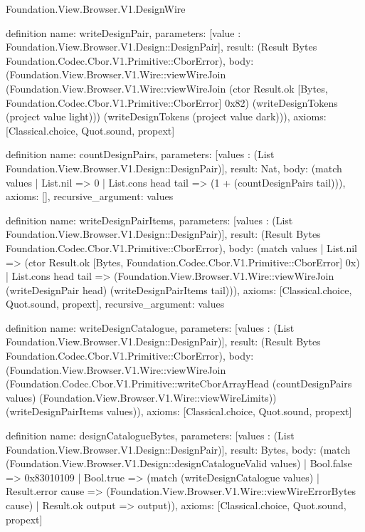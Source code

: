 \begin{lexlean}{Foundation.View.Browser.V1.DesignWire}
\begin{semanticmodule}
definition{
  name: writeDesignPair,
  parameters: [value : Foundation.View.Browser.V1.Design::DesignPair],
  result: (Result Bytes Foundation.Codec.Cbor.V1.Primitive::CborError),
  body: (Foundation.View.Browser.V1.Wire::viewWireJoin (Foundation.View.Browser.V1.Wire::viewWireJoin (ctor Result.ok [Bytes, Foundation.Codec.Cbor.V1.Primitive::CborError] 0x82) (writeDesignTokens (project value light))) (writeDesignTokens (project value dark))),
  axioms: [Classical.choice, Quot.sound, propext]
}

definition{
  name: countDesignPairs,
  parameters: [values : (List Foundation.View.Browser.V1.Design::DesignPair)],
  result: Nat,
  body: (match values | List.nil => 0 | List.cons head tail => (1 + (countDesignPairs tail))),
  axioms: [],
  recursive_argument: values
}

definition{
  name: writeDesignPairItems,
  parameters: [values : (List Foundation.View.Browser.V1.Design::DesignPair)],
  result: (Result Bytes Foundation.Codec.Cbor.V1.Primitive::CborError),
  body: (match values
    | List.nil => (ctor Result.ok [Bytes, Foundation.Codec.Cbor.V1.Primitive::CborError] 0x)
    | List.cons head tail => (Foundation.View.Browser.V1.Wire::viewWireJoin (writeDesignPair head) (writeDesignPairItems tail))),
  axioms: [Classical.choice, Quot.sound, propext],
  recursive_argument: values
}

definition{
  name: writeDesignCatalogue,
  parameters: [values : (List Foundation.View.Browser.V1.Design::DesignPair)],
  result: (Result Bytes Foundation.Codec.Cbor.V1.Primitive::CborError),
  body: (Foundation.View.Browser.V1.Wire::viewWireJoin (Foundation.Codec.Cbor.V1.Primitive::writeCborArrayHead (countDesignPairs values) (Foundation.View.Browser.V1.Wire::viewWireLimits)) (writeDesignPairItems values)),
  axioms: [Classical.choice, Quot.sound, propext]
}

definition{
  name: designCatalogueBytes,
  parameters: [values : (List Foundation.View.Browser.V1.Design::DesignPair)],
  result: Bytes,
  body: (match (Foundation.View.Browser.V1.Design::designCatalogueValid values)
    | Bool.false => 0x83010109
    | Bool.true => (match (writeDesignCatalogue values)
      | Result.error cause => (Foundation.View.Browser.V1.Wire::viewWireErrorBytes cause)
      | Result.ok output => output)),
  axioms: [Classical.choice, Quot.sound, propext]
}
\end{semanticmodule}
\end{lexlean}
